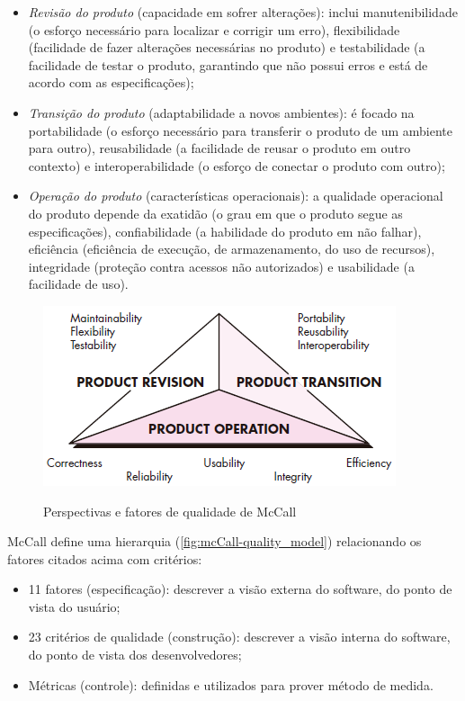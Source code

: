 \documentclass[
	12pt,				%
	openright,			%
	oneside,			%
	a4paper,			%
	english,			%
	brazil,				%
	]{abntex2}
\begin{document}
\begin{itemize}
    \item \emph{Revisão do produto} (capacidade em sofrer alterações): inclui manutenibilidade (o esforço necessário para localizar e corrigir um erro), flexibilidade (facilidade de fazer alterações necessárias no produto) e testabilidade (a facilidade de testar o produto, garantindo que não possui erros e está de acordo com as especificações);
    \item \emph{Transição do produto} (adaptabilidade a novos ambientes): é focado na portabilidade (o esforço necessário para transferir o produto de um ambiente para outro), reusabilidade (a facilidade de reusar o produto em outro contexto) e interoperabilidade (o esforço de conectar o produto com outro);
    \item \emph{Operação do produto} (características operacionais): a qualidade operacional do produto depende da exatidão (o grau em que o produto segue as especificações), confiabilidade (a habilidade do produto em não falhar), eficiência (eficiência de execução, de armazenamento, do uso de recursos), integridade (proteção contra acessos não autorizados) e usabilidade (a facilidade de uso).
\end{itemize}

\begin{figure}[h]
    \centering
    \caption{Perspectivas e fatores de qualidade de McCall}
    \graphicspath{ {./graphics/} }
    \includegraphics[scale=0.8]{mcCall-fatores_qualidade}
    \label{fig:mcCall-fatores_qualidade}
\end{figure}

McCall define uma hierarquia (\autoref{fig:mcCall-quality_model}) relacionando os fatores citados acima com critérios:
\begin{itemize}
    \item 11 fatores (especificação): descrever a visão externa do software, do ponto de vista do usuário;
    \item 23 critérios de qualidade (construção): descrever a visão interna do software, do ponto de vista dos desenvolvedores;
    \item Métricas (controle): definidas e utilizados para prover método de medida.
\end{itemize}
\end{document}
